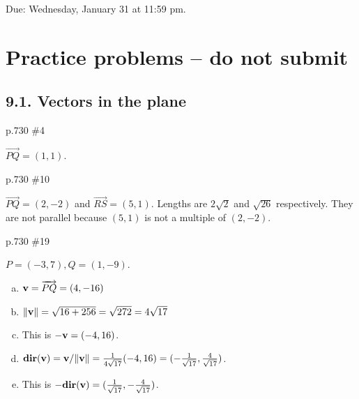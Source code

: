 \maketitle

Due: Wednesday, January 31 at 11:59 pm.

\section{Practice problems -- do not submit}

\subsection*{9.1. Vectors in the plane}
\begin{practice}p.730 \#4\end{practice}
\begin{pracsol}
  $\overrightarrow{PQ}=(1,1)$.
  \begin{center}
  \end{center}
\end{pracsol}
\begin{practice}p.730 \#10\end{practice}
\begin{pracsol}
  $\overrightarrow{PQ}=(2,-2)$ and $\overrightarrow{RS}=(5,1)$. Lengths are $2\sqrt 2$ and $\sqrt{26}$ respectively. They are not parallel because $(5,1)$ is not a multiple of $(2,-2)$.
\end{pracsol}
\begin{practice}p.730 \#19\end{practice}
\begin{pracsol}
  $P=(-3,7),Q=(1,-9)$.
  \begin{enumerate}[(a)]
    \item $\mathbf v=\overrightarrow{PQ}=(4,-16)$
    \item $\|\mathbf v\|=\sqrt{16+256}=\sqrt{272}=4\sqrt{17}$
    \item This is $-\mathbf v=(-4,16)$.
    \item $\mathbf{dir}(\mathbf v)=\mathbf v/\|\mathbf v\|=\frac1{4\sqrt{17}}(-4,16)=(-\frac1{\sqrt{17}},\frac 4{\sqrt{17}})$.
    \item This is $-\mathbf{dir}(\mathbf v)=(\frac 1{\sqrt{17}},-\frac4{\sqrt{17}})$.
  \end{enumerate}
\end{pracsol}
